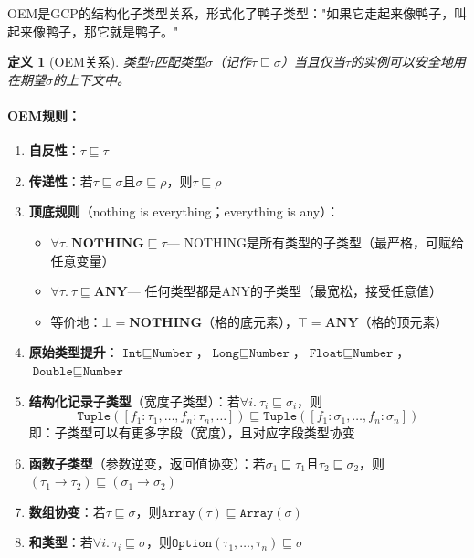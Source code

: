 \documentclass[UTF8]{article}
\newtheorem{definition}[theorem]{定义}
\newcommand{\NOTHING}{\mathbf{NOTHING}}
\newcommand{\ANY}{\mathbf{ANY}}
\begin{document}
OEM是GCP的结构化子类型关系，形式化了鸭子类型："如果它走起来像鸭子，叫起来像鸭子，那它就是鸭子。"

\begin{definition}[OEM关系]
类型$\tau$匹配类型$\sigma$（记作$\tau \sqsubseteq \sigma$）当且仅当$\tau$的实例可以安全地用在期望$\sigma$的上下文中。
\end{definition}

\paragraph{OEM规则：}
\begin{enumerate}[leftmargin=2em]
\item \textbf{自反性}：$\tau \sqsubseteq \tau$
\item \textbf{传递性}：若$\tau \sqsubseteq \sigma$且$\sigma \sqsubseteq \rho$，则$\tau \sqsubseteq \rho$
\item \textbf{顶底规则}（nothing is everything；everything is any）：
  \begin{itemize}
  \item $\forall\tau.\ \NOTHING \sqsubseteq \tau$\quad — NOTHING是所有类型的子类型（最严格，可赋给任意变量）
  \item $\forall\tau.\ \tau \sqsubseteq \ANY$\quad — 任何类型都是ANY的子类型（最宽松，接受任意值）
  \item 等价地：$\bot = \NOTHING$（格的底元素），$\top = \ANY$（格的顶元素）
  \end{itemize}
\item \textbf{原始类型提升}：$\texttt{Int} \sqsubseteq \texttt{Number}$，$\texttt{Long} \sqsubseteq \texttt{Number}$，$\texttt{Float} \sqsubseteq \texttt{Number}$，$\texttt{Double} \sqsubseteq \texttt{Number}$
\item \textbf{结构化记录子类型}（宽度子类型）：若$\forall i.\ \tau_i \sqsubseteq \sigma_i$，则
  \[\texttt{Tuple}([f_1:\tau_1,\ldots,f_n:\tau_n,\ldots]) \sqsubseteq \texttt{Tuple}([f_1:\sigma_1,\ldots,f_n:\sigma_n])\]
  即：子类型可以有更多字段（宽度），且对应字段类型协变
\item \textbf{函数子类型}（参数逆变，返回值协变）：若$\sigma_1 \sqsubseteq \tau_1$且$\tau_2 \sqsubseteq \sigma_2$，则$(\tau_1 \to \tau_2) \sqsubseteq (\sigma_1 \to \sigma_2)$
\item \textbf{数组协变}：若$\tau \sqsubseteq \sigma$，则$\texttt{Array}(\tau) \sqsubseteq \texttt{Array}(\sigma)$
\item \textbf{和类型}：若$\forall i.\ \tau_i \sqsubseteq \sigma$，则$\texttt{Option}(\tau_1,\ldots,\tau_n) \sqsubseteq \sigma$
\end{enumerate}
\end{document}
